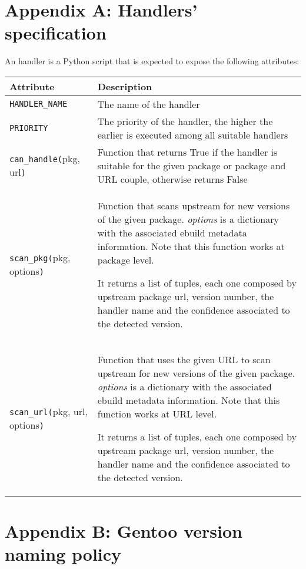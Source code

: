 
\section*{Appendix A: Handlers' specification}
\label{sec:handlers_appendix}
An handler is a Python script that is expected to expose the following attributes:

\bgroup
\def\arraystretch{1.2}
\begin{table}[ht]
\centering
\begin{tabular}{l p{8cm}}
\hline\hline
Attribute & Description \\
\hline

\texttt{HANDLER\_NAME} & The name of the handler \\
\hline

\texttt{PRIORITY} & The priority of the handler, the higher the earlier is executed among all suitable handlers \\
\hline

\texttt{can\_handle(}pkg, url\texttt{)} &  Function that returns True if the handler is suitable for the given package or package and URL couple, otherwise returns False \\
\hline

\texttt{scan\_pkg(}pkg, options\texttt{)} & Function that scans upstream for new versions of the given package. \emph{options} is a dictionary with the associated ebuild metadata information. Note that this function works at package level.

It returns a list of tuples, each one composed by upstream package url, version number, the handler name and the confidence associated to the detected version. \\
\hline

\texttt{scan\_url(}pkg, url, options\texttt{)} & Function that uses the given URL to scan upstream for new versions of the given package. \emph{options} is a dictionary with the associated ebuild metadata information. Note that this function works at URL level.

It returns a list of tuples, each one composed by upstream package url, version number, the handler name and the confidence associated to the detected version. \\
\hline

\end{tabular}
\end{table}
\egroup


\section*{Appendix B: Gentoo version naming policy}
\label{sec:version_appendix}

